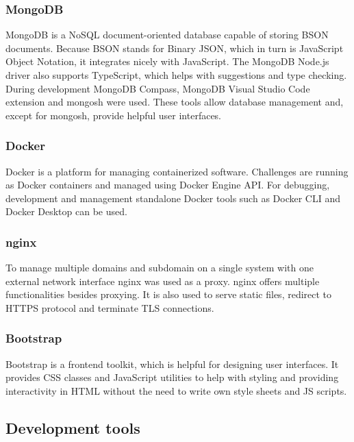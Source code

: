 \subsubsection{MongoDB}

MongoDB is a NoSQL document-oriented database capable of storing BSON documents. Because BSON stands for Binary JSON, which in turn is JavaScript Object Notation, it integrates nicely with JavaScript. The MongoDB Node.js driver also supports TypeScript, which helps with suggestions and type checking.\\
During development MongoDB Compass, MongoDB Visual Studio Code extension and mongosh were used. These tools allow database management and, except for mongosh, provide helpful user interfaces.

\subsubsection{Docker}

Docker is a platform for managing containerized software. Challenges are running as Docker containers and managed using Docker Engine API. For debugging, development and management standalone Docker tools such as Docker CLI and Docker Desktop can be used.

\subsubsection{nginx}

To manage multiple domains and subdomain on a single system with one external network interface nginx was used as a proxy. nginx offers multiple functionalities besides proxying. It is also used to serve static files, redirect to HTTPS protocol and terminate TLS connections.

\subsubsection{Bootstrap}

Bootstrap is a frontend toolkit, which is helpful for designing user interfaces. It provides CSS classes and JavaScript utilities to help with styling and providing interactivity in HTML without the need to write own style sheets and JS scripts.

\subsection{Development tools}

